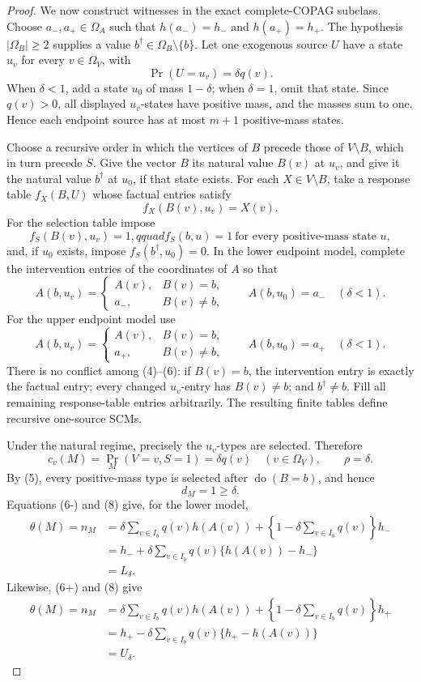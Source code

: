 \documentclass{article}
\begin{document}
\begin{proof}
We now construct witnesses in the exact complete-COPAG subclass.  Choose \(a_-,a_+\in\Omega_A\) such that \(h(a_-)=h_-\) and \(h(a_+)=h_+\).  The hypothesis \(|\Omega_B|\geq2\) supplies a value \(b^\dagger\in\Omega_B\setminus\{b\}\).  Let one exogenous source \(U\) have a state \(u_v\) for every \(v\in\Omega_V\), with
\[
\Pr(U=u_v)=\delta q(v).
\]
When \(\delta<1\), add a state \(u_0\) of mass \(1-\delta\); when \(\delta=1\), omit that state.  Since \(q(v)>0\), all displayed \(u_v\)-states have positive mass, and the masses sum to one.  Hence each endpoint source has at most \(m+1\) positive-mass states.

Choose a recursive order in which the vertices of \(B\) precede those of \(V\setminus B\), which in turn precede \(S\).  Give the vector \(B\) its natural value \(B(v)\) at \(u_v\), and give it the natural value \(b^\dagger\) at \(u_0\), if that state exists.  For each \(X\in V\setminus B\), take a response table \(f_X(B,U)\) whose factual entries satisfy
\[
f_X(B(v),u_v)=X(v). \tag{4}
\]
For the selection table impose
\[
f_S(B(v),u_v)=1,qquad
f_S(b,u)=1\ \text{for every positive-mass state }u, \tag{5}
\]
and, if \(u_0\) exists, impose \(f_S(b^\dagger,u_0)=0\).  In the lower endpoint model, complete the intervention entries of the coordinates of \(A\) so that
\[
A(b,u_v)=
\begin{cases}
A(v),&B(v)=b,\\
a_-,&B(v)\neq b,
\end{cases}
\qquad
A(b,u_0)=a_-\quad(\delta<1). \tag{6-}
\]
For the upper endpoint model use
\[
A(b,u_v)=
\begin{cases}
A(v),&B(v)=b,\\
a_+,&B(v)\neq b,
\end{cases}
\qquad
A(b,u_0)=a_+\quad(\delta<1). \tag{6+}
\]
There is no conflict among (4)--(6): if \(B(v)=b\), the intervention entry is exactly the factual entry; every changed \(u_v\)-entry has \(B(v)\neq b\); and \(b^\dagger\neq b\).  Fill all remaining response-table entries arbitrarily.  The resulting finite tables define recursive one-source SCMs.

Under the natural regime, precisely the \(u_v\)-types are selected.  Therefore
\[
c_v(M)=\Pr_M(V=v,S=1)=\delta q(v)\quad(v\in\Omega_V),
\qquad \rho=\delta. \tag{7}
\]
By (5), every positive-mass type is selected after \(\operatorname{do}(B=b)\), and hence
\[
d_M=1\geq\delta. \tag{8}
\]
Equations (6-) and (8) give, for the lower model,
\[
\begin{aligned}
\theta(M)
=n_M
&=\delta\sum_{v\in I_b}q(v)h(A(v))
+\left\{1-\delta\sum_{v\in I_b}q(v)\right\}h_-\\
&=h_-+\delta\sum_{v\in I_b}q(v)\{h(A(v))-h_-\}\\
&=L_\delta.
\end{aligned} \tag{9-}
\]
Likewise, (6+) and (8) give
\[
\begin{aligned}
\theta(M)
=n_M
&=\delta\sum_{v\in I_b}q(v)h(A(v))
+\left\{1-\delta\sum_{v\in I_b}q(v)\right\}h_+\\
&=h_+-\delta\sum_{v\in I_b}q(v)\{h_+-h(A(v))\}\\
&=U_\delta.
\end{aligned} \tag{9+}
\]


\end{proof}
\end{document}
